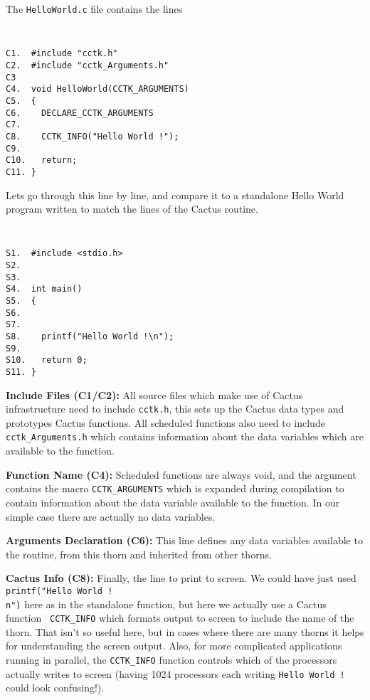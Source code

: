 \documentclass{article}
\begin{document}
The {\tt HelloWorld.c} file contains the lines

{\tt
\begin{verbatim}
C1.  #include "cctk.h"
C2.  #include "cctk_Arguments.h"
C3  
C4.  void HelloWorld(CCTK_ARGUMENTS)
C5.  {
C6.    DECLARE_CCTK_ARGUMENTS
C7. 
C8.    CCTK_INFO("Hello World !");
C9.
C10.   return;
C11. }
\end{verbatim}
}

Lets go through this line by line, and compare it to a standalone Hello World program written to match the lines of the Cactus routine.

{\tt
\begin{verbatim}
S1.  #include <stdio.h>
S2.  
S3. 
S4.  int main()
S5.  {
S6.  
S7. 
S8.    printf("Hello World !\n");
S9. 
S10.   return 0;
S11. }
\end{verbatim}
}

\begin{description}

\item{\bf Include Files (C1/C2):} All source files which make use of Cactus infrastructure need to include {\tt cctk.h}, this sets up the Cactus data types and prototypes Cactus functions. All scheduled functions also need to include {\tt cctk\_Arguments.h} which contains information about the data variables which are available to the function.

\item{\bf Function Name (C4):} Scheduled functions are always void, and the argument contains the macro {\tt CCTK\_ARGUMENTS} which is expanded during compilation to contain information about the data variable available to the function. In our simple case there are actually no data variables.

\item{\bf Arguments Declaration (C6):} This line defines any data variables 
available to the routine, from this thorn and inherited from other thorns.

\item{\bf Cactus Info (C8):} Finally, the line to print to screen. We could
have just used {\tt printf("Hello World !\\n")} here as in the
standalone function, but here we actually use a Cactus function {\tt
CCTK\_INFO} which formats output to screen to include the name of the
thorn. That isn't so useful here, but in cases where there are many
thorns it helps for understanding the screen output. Also, for more complicated applications running in parallel, the {\tt CCTK\_INFO} function controls which of the processors actually writes to screen (having 1024 processors each writing {\tt Hello World !} could look confusing!).

\end{description}
\end{document}

